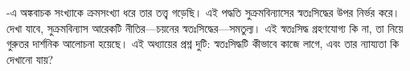 \documentclass[../../../include/open-logic-section]{subfiles}
\begin{document}


-এ
অঙ্কবাচক সংখ্যাকে ক্রমসংখ্যা ধরে তার তত্ত্ব গড়েছি।
এই পদ্ধতি সুক্রমবিন্যাসের স্বতঃসিদ্ধের উপর নির্ভর করে।
দেখা যাবে, সুক্রমবিন্যাস আরেকটি নীতির—চয়নের
স্বতঃসিদ্ধের—সমতুল্য। এই স্বতঃসিদ্ধ গ্রহণযোগ্য কি না,
তা নিয়ে গুরুতর দার্শনিক আলোচনা হয়েছে। এই অধ্যায়ের
প্রশ্ন দুটি: স্বতঃসিদ্ধটি কীভাবে কাজে লাগে, এবং তার
ন্যায্যতা কি দেখানো যায়?
\end{document}
